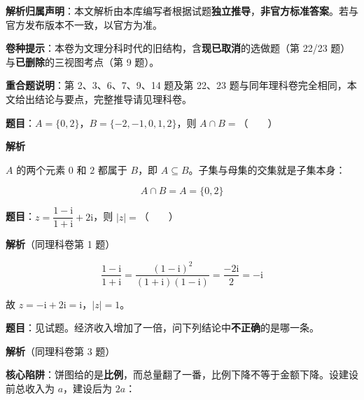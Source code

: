 

\begin{gknotice}
\textbf{ 解析归属声明}：本文解析由本库编写者根据试题\textbf{独立推导}，\textbf{非官方标准答案}。若与官方发布版本不一致，以官方为准。

\textbf{ 卷种提示}：本卷为文理分科时代的旧结构，含\textbf{现已取消}的选做题（第 22/23 题）与\textbf{已删除}的三视图考点（第 9 题）。

\textbf{重合题说明}：第 2、3、6、7、9、14 题及第 22、23 题与同年理科卷完全相同，本文给出结论与要点，完整推导请见理科卷。
\end{gknotice}

\par\medskip



\textbf{题目}：$A=\{0,2\}$，$B=\{-2,-1,0,1,2\}$，则 $A\cap B=$（　　）

\textbf{解析}

$A$ 的两个元素 $0$ 和 $2$ 都属于 $B$，即 $A\subseteq B$。子集与母集的交集就是子集本身：

\[A\cap B=A=\{0,2\}\]


\par\medskip


\textbf{题目}：$z=\dfrac{1-\mathrm i}{1+\mathrm i}+2\mathrm i$，则 $|z|=$（　　）

\textbf{解析}（同理科卷第 1 题）

\[\frac{1-\mathrm i}{1+\mathrm i}=\frac{(1-\mathrm i)^{2}}{(1+\mathrm i)(1-\mathrm i)}=\frac{-2\mathrm i}2=-\mathrm i\]

故 $z=-\mathrm i+2\mathrm i=\mathrm i$，$|z|=1$。


\par\medskip


\textbf{题目}：见试题。经济收入增加了一倍，问下列结论中\textbf{不正确}的是哪一条。

\begin{center}\end{center}

\textbf{解析}（同理科卷第 3 题）

\textbf{核心陷阱}：饼图给的是\textbf{比例}，而总量翻了一番，比例下降不等于金额下降。设建设前总收入为 $a$，建设后为 $2a$：

